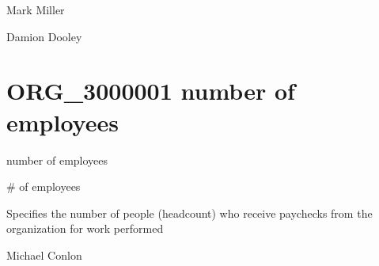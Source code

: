 \documentclass[letterpaper,10pt,english]{sphinxmanual}
\begin{document}
\begin{sphinxShadowBox}

\sphinxAtStartPar
{}
\end{sphinxShadowBox}

\begin{sphinxShadowBox}

\sphinxAtStartPar
Mark Miller

\sphinxAtStartPar
Damion Dooley
\end{sphinxShadowBox}
\begin{quote}
\label{\detokenize{doc-ORG_3000001:org-3000001}}\label{\detokenize{doc-ORG_3000001:number-of-employees}}\label{\detokenize{doc-ORG_3000001:org-3000001}}
\ignorespaces \end{quote}


\section{ORG\_3000001 \sphinxhyphen{} number of employees}
\label{\detokenize{doc-ORG_3000001:org-3000001-number-of-employees}}\label{\detokenize{doc-ORG_3000001:index-0}}\label{\detokenize{doc-ORG_3000001::doc}}
\begin{sphinxShadowBox}

\sphinxAtStartPar
number of employees
\end{sphinxShadowBox}

\begin{sphinxShadowBox}

\sphinxAtStartPar
\# of employees
\end{sphinxShadowBox}

\begin{sphinxShadowBox}

\sphinxAtStartPar
Specifies the number of people (headcount) who receive paychecks from the organization for work performed
\end{sphinxShadowBox}

\begin{sphinxShadowBox}

\sphinxAtStartPar
Michael Conlon 
\end{sphinxShadowBox}
\end{document}
